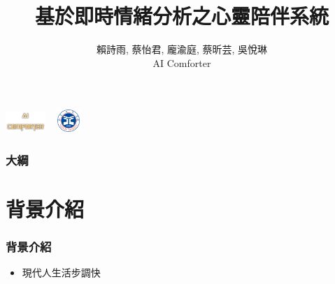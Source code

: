 \documentclass[10pt, conference, compsocconf]{beamer}
\begin{document}
\begin{CJK}{UTF8}{}%
\title{基於即時情緒分析之心靈陪伴系統}
\author{
賴詩雨, 蔡怡君, 龐渝庭, 蔡昕芸, 吳悅琳 \\
\vspace{5mm}
AI Comforter\\
}





\begin{frame}
\titlepage
\raggedleft \includegraphics[width=1.5cm]{./Figures/AI_Comforter_5.png} ~
\raggedleft \includegraphics[width=0.9cm]{./Figures/yzu-logo.png}
\end{frame}



\begin{frame}
\frametitle{大綱}
  \tableofcontents
\end{frame}

\section{背景介紹}
\begin{frame}
\frametitle{背景介紹}

\begin{itemize}
\item \Large 現代人生活步調快
\end{itemize}



\end{frame}
\end{CJK}
\end{document}
